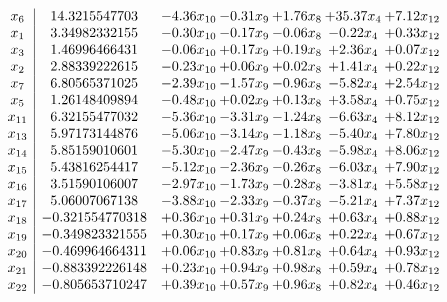 \documentclass[8pt]{article}
\begin{document}
\[\begin{array}{c| c c@{\hskip 2pt} c@{\hskip 2pt} c@{\hskip 2pt} c@{\hskip 2pt} c@{\hskip 2pt} }
 x_{6}   &  14.3215547703 & -4.36 x_{10} & -0.31 x_{9} & +  1.76 x_{8} & + 35.37 x_{4} & +  7.12 x_{12}\\
 x_{1}   &  3.34982332155 & -0.30 x_{10} & -0.17 x_{9} & -0.06 x_{8} & -0.22 x_{4} & +  0.33 x_{12}\\
 x_{3}   &  1.46996466431 & -0.06 x_{10} & +  0.17 x_{9} & +  0.19 x_{8} & +  2.36 x_{4} & +  0.07 x_{12}\\
 x_{2}   &  2.88339222615 & -0.23 x_{10} & +  0.06 x_{9} & +  0.02 x_{8} & +  1.41 x_{4} & +  0.22 x_{12}\\
 x_{7}   &  6.80565371025 & -2.39 x_{10} & -1.57 x_{9} & -0.96 x_{8} & -5.82 x_{4} & +  2.54 x_{12}\\
 x_{5}   &  1.26148409894 & -0.48 x_{10} & +  0.02 x_{9} & +  0.13 x_{8} & +  3.58 x_{4} & +  0.75 x_{12}\\
 x_{11}   &  6.32155477032 & -5.36 x_{10} & -3.31 x_{9} & -1.24 x_{8} & -6.63 x_{4} & +  8.12 x_{12}\\
 x_{13}   &  5.97173144876 & -5.06 x_{10} & -3.14 x_{9} & -1.18 x_{8} & -5.40 x_{4} & +  7.80 x_{12}\\
 x_{14}   &  5.85159010601 & -5.30 x_{10} & -2.47 x_{9} & -0.43 x_{8} & -5.98 x_{4} & +  8.06 x_{12}\\
 x_{15}   &  5.43816254417 & -5.12 x_{10} & -2.36 x_{9} & -0.26 x_{8} & -6.03 x_{4} & +  7.90 x_{12}\\
 x_{16}   &  3.51590106007 & -2.97 x_{10} & -1.73 x_{9} & -0.28 x_{8} & -3.81 x_{4} & +  5.58 x_{12}\\
 x_{17}   &  5.06007067138 & -3.88 x_{10} & -2.33 x_{9} & -0.37 x_{8} & -5.21 x_{4} & +  7.37 x_{12}\\
 x_{18}   &  -0.321554770318 & +  0.36 x_{10} & +  0.31 x_{9} & +  0.24 x_{8} & +  0.63 x_{4} & +  0.88 x_{12}\\
 x_{19}   &  -0.349823321555 & +  0.30 x_{10} & +  0.17 x_{9} & +  0.06 x_{8} & +  0.22 x_{4} & +  0.67 x_{12}\\
 x_{20}   &  -0.469964664311 & +  0.06 x_{10} & +  0.83 x_{9} & +  0.81 x_{8} & +  0.64 x_{4} & +  0.93 x_{12}\\
 x_{21}   &  -0.883392226148 & +  0.23 x_{10} & +  0.94 x_{9} & +  0.98 x_{8} & +  0.59 x_{4} & +  0.78 x_{12}\\
 x_{22}   &  -0.805653710247 & +  0.39 x_{10} & +  0.57 x_{9} & +  0.96 x_{8} & +  0.82 x_{4} & +  0.46 x_{12}\\

\end{array}\]
\end{document}
